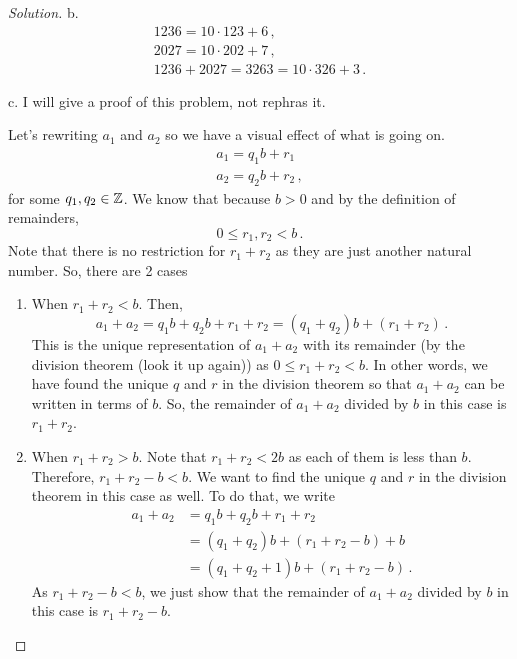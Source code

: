 \documentclass[12pt]{amsart}
\begin{document}
\begin{enumerate}[label=\arabic*.,itemsep=10pt, leftmargin=*]
\begin{proof}[Solution]
        b. 
        \begin{gather*}
           1236 = 10\cdot 123 + 6  \,, \\
           2027 = 10 \cdot 202 + 7  \,, \\
           1236 + 2027 = 3263 = 10 \cdot 326 + 3 \,.
        \end{gather*}

        c. I will give a proof of this problem, not rephras it.

        Let's rewriting $a_1$ and $a_2$ so we have a visual effect of what is 
        going on.
        \begin{gather*}
            a_1 =  q_1 b + r_1 \\
            a_2 = q_2 b + r_2 \,,
        \end{gather*}
        for some $q_1, q_2 \in \mathbb{Z}$.
        We know that because $b>0$ and by the definition of remainders,  
        \begin{equation*}
            0\leq r_1, r_2 < b \,.
        \end{equation*}
        Note that there is no restriction for $r_1 + r_2$ as they are just another
        natural number. So, there are 2 cases
        \begin{enumerate}
            \item When $r_1 + r_2 <b$. Then,
                \begin{equation*}
                    a_1 + a_2 = q_1 b + q_2 b + r_1 + r_2
                    = (q_1 + q_2) b + (r_1 + r_2) \,.
                \end{equation*}
                This is the unique representation of $a_1 + a_2$ with its remainder 
                (by the division theorem (look it up again)) as $0\leq r_1 + r_2 < b$.
                In other words, we have found the unique $q$ 
                and $r$ in the division theorem
                so that $a_1 + a_2$ can be written in terms of $b$.
                So, the remainder of $a_1 + a_2$ divided by $b$ in this case
                is $r_1 + r_2$.

            \item When $r_1 + r_2 >b$. Note that $r_1 + r_2 < 2b$ as each of them
                is less than $b$. Therefore, $r_1 + r_2 - b < b$.
                We want to find the unique $q$ and $r$ in the division theorem in 
                this case as well. To do that, we write
                \begin{align*}
                    a_1 + a_2 &= q_1 b + q_2 b + r_1 + r_2 \\
                              &= (q_1 + q_2) b + (r_1 + r_2 - b) + b  \\
                              &= (q_1 + q_2 + 1) b + (r_1 + r_2 - b)  
                    \,.
                \end{align*}
                As $r_1 + r_2 - b <b$, we just show that the remainder of 
                $a_1+ a_2$ divided by $b$ in this case is $r_1 + r_2 - b$.
        \end{enumerate}
    \end{proof}





\end{enumerate}
\end{document}
